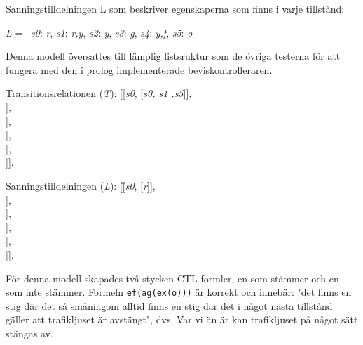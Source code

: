 Sanningstilldelningen L som beskriver egenskaperna som finns i varje tillstånd:
\begin{tabbing}
\textit{L} = \textbraceleft\
\textit{s0}:\textbraceleft
\textit{r}\textbraceright, 
\textit{s1}:\textbraceleft 
\textit{r,y}\textbraceright, 
\textit{s2}:\textbraceleft 
\textit{y}\textbraceright, 
\textit{s3}:\textbraceleft 
\textit{g}\textbraceright, 
\textit{s4}:\textbraceleft 
\textit{y,f}\textbraceright, 
\textit{s5}:\textbraceleft 
\textit{o}\textbraceright\ \textbraceright
\end{tabbing}

Denna modell översattes till lämplig listsruktur som de övriga testerna för att fungera med den i prolog implementerade beviskontrolleraren.
\begin{tabbing}
Transitionsrelationen (\textit{T}):
[\=[\textit{s0}, [\textit{s0, s1 ,s5}]],\\
\>[\textit{s1}, [\textit{s0, s3, s5}]],\\
\>[\textit{s2}, [\textit{s0, s1, s3, s5}]],\\
\>[\textit{s3}, [\textit{s3, s2, s5}]],\\
\>[\textit{s4}, [\textit{s4, s5}]],\\
\>[\textit{s5}, [\textit{s5, s0, s4, s5}]]].\\
\end{tabbing}

\begin{tabbing}
Sanningstilldelningen (\textit{L}):
[\=[\textit{s0}, [\textit{r}]],\\
\>[\textit{s1}, [\textit{r,y}]],\\
\>[\textit{s2}, [\textit{y}]],\\
\>[\textit{s3}, [\textit{g}]],\\
\>[\textit{s4}, [\textit{y,f}]],\\
\>[\textit{s5}, [\textit{o}]]].\\
\end{tabbing}

För denna modell skapades två stycken CTL-formler, en som stämmer och en som inte stämmer.
Formeln \texttt{ef(ag(ex(o)))} är korrekt och innebär: "det finns en stig där det så småningom alltid finns en stig där det i något nästa tillstånd gäller att trafikljuset är avstängt", dvs. Var vi än är kan trafikljuset på något sätt stängas av.